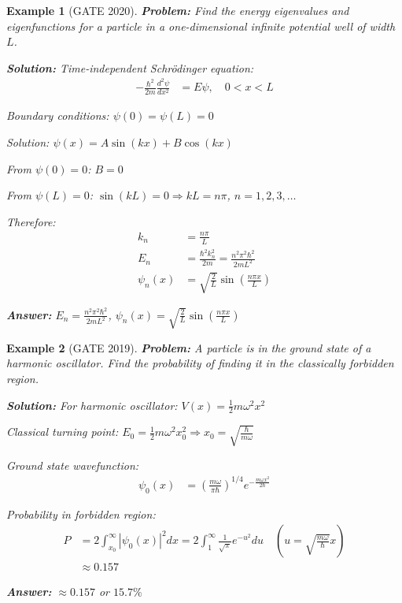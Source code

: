 \documentclass[12pt,a4paper]{article}
\newtheorem{example}{Example}[section]
\newcommand{\ans}[1]{\textcolor{red!70!black}{\textbf{Answer:} #1}}
\newcommand{\sol}{\textcolor{blue!70!black}{\textbf{Solution:}}}
\begin{document}
\begin{example}[GATE 2020]
\textbf{Problem:} Find the energy eigenvalues and eigenfunctions for a particle in a one-dimensional infinite potential well of width $L$.

\sol
Time-independent Schrödinger equation:
\begin{align}
-\frac{\hbar^2}{2m}\frac{d^2\psi}{dx^2} &= E\psi, \quad 0 < x < L
\end{align}

Boundary conditions: $\psi(0) = \psi(L) = 0$

Solution: $\psi(x) = A\sin(kx) + B\cos(kx)$

From $\psi(0) = 0$: $B = 0$

From $\psi(L) = 0$: $\sin(kL) = 0 \Rightarrow kL = n\pi$, $n = 1,2,3,\ldots$

Therefore:
\begin{align}
k_n &= \frac{n\pi}{L}\\
E_n &= \frac{\hbar^2 k_n^2}{2m} = \frac{n^2\pi^2\hbar^2}{2mL^2}\\
\psi_n(x) &= \sqrt{\frac{2}{L}}\sin\left(\frac{n\pi x}{L}\right)
\end{align}

\ans{$E_n = \frac{n^2\pi^2\hbar^2}{2mL^2}$, $\psi_n(x) = \sqrt{\frac{2}{L}}\sin\left(\frac{n\pi x}{L}\right)$}
\end{example}

\begin{example}[GATE 2019]
\textbf{Problem:} A particle is in the ground state of a harmonic oscillator. Find the probability of finding it in the classically forbidden region.

\sol
For harmonic oscillator: $V(x) = \frac{1}{2}m\omega^2 x^2$

Classical turning point: $E_0 = \frac{1}{2}m\omega^2 x_0^2 \Rightarrow x_0 = \sqrt{\frac{\hbar}{m\omega}}$

Ground state wavefunction:
\begin{align}
\psi_0(x) &= \left(\frac{m\omega}{\pi\hbar}\right)^{1/4} e^{-\frac{m\omega x^2}{2\hbar}}
\end{align}

Probability in forbidden region:
\begin{align}
P &= 2\int_{x_0}^{\infty} |\psi_0(x)|^2 dx = 2\int_1^{\infty} \frac{1}{\sqrt{\pi}} e^{-u^2} du \quad (u = \sqrt{\frac{m\omega}{\hbar}}x)\\
&\approx 0.157
\end{align}

\ans{$\approx 0.157$ or $15.7\%$}
\end{example}
\end{document}
